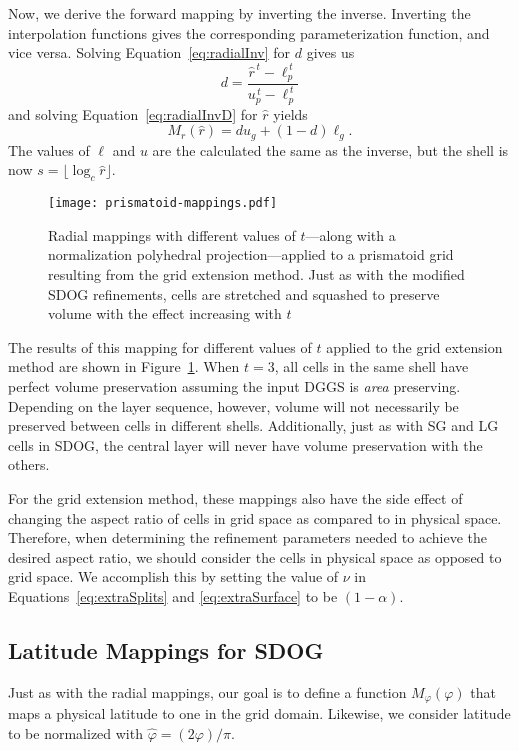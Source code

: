 Now, we derive the forward mapping by inverting the inverse.
Inverting the interpolation functions gives the corresponding parameterization function, and vice versa.
Solving Equation~\ref{eq:radialInv} for $d$ gives us
%
\begin{equation} \label{radialForwD}
d = \frac{ \hat{r}^{\,t} - \ell_p^{\,t} }{ u_p^{\,t} - \ell_p^{\,t} }
\end{equation}
%
and solving Equation~\ref{eq:radialInvD} for $\hat{r}$ yields
%
\begin{equation} \label{eq:radialForw}
M_r (\hat{r}) = d u_g + \left( 1 - d \right) \ell_g.
\end{equation}
%
The values of $\ell$ and $u$ are the calculated the same as the inverse, but the shell is now $s = \lfloor \log_{c} \hat{r} \rfloor$.


\begin{figure}[ht!]
	\centering
	\texttt{[image: prismatoid-mappings.pdf]}
	\caption[Radial mappings applied to the grid extension method]{
		Radial mappings with different values of $t$---along with a normalization polyhedral projection---applied to a prismatoid grid resulting from the grid extension method.
		Just as with the modified SDOG refinements, cells are stretched and squashed to preserve volume with the effect increasing with $t$
	}
	\label{fig:prismatoid-mappings}
\end{figure}


The results of this mapping for different values of $t$ applied to the grid extension method are shown in Figure~\ref{fig:prismatoid-mappings}.
When $t=3$, all cells in the same shell have perfect volume preservation assuming the input DGGS is \textit{area} preserving.
Depending on the layer sequence, however, volume will not necessarily be preserved between cells in different shells.
Additionally, just as with SG and LG cells in SDOG, the central layer will never have volume preservation with the others.


For the grid extension method, these mappings also have the side effect of changing the aspect ratio of cells in grid space as compared to in physical space.
Therefore, when determining the refinement parameters needed to achieve the desired aspect ratio, we should consider the cells in physical space as opposed to grid space.
We accomplish this by setting the value of $\nu$ in Equations~\ref{eq:extraSplits} and \ref{eq:extraSurface} to be $(1 - \alpha)$.


\subsection{Latitude Mappings for SDOG} \label{chap:6:latitude}
Just as with the radial mappings, our goal is to define a function $M_\varphi(\varphi)$ that maps a physical latitude to one in the grid domain. Likewise, we consider latitude to be normalized with $\hat{\varphi} = (2\varphi) / \pi$.


